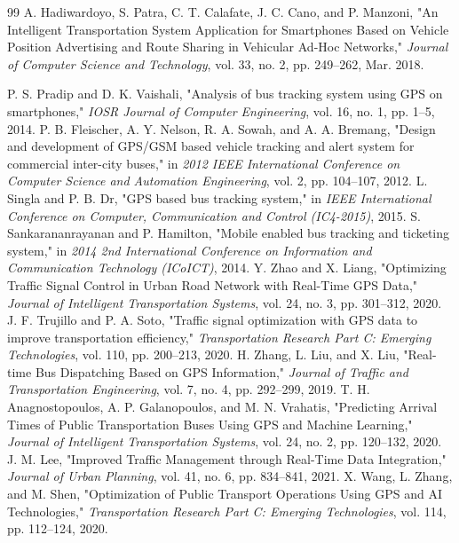 \begin{thebibliography}{99}
 A. Hadiwardoyo, S. Patra, C. T. Calafate, J. C. Cano, and P. Manzoni, "An Intelligent Transportation System Application for Smartphones Based on Vehicle Position Advertising and Route Sharing in Vehicular Ad-Hoc Networks," \textit{Journal of Computer Science and Technology}, vol. 33, no. 2, pp. 249--262, Mar. 2018.

 P. S. Pradip and D. K. Vaishali, "Analysis of bus tracking system using GPS on smartphones," \textit{IOSR Journal of Computer Engineering}, vol. 16, no. 1, pp. 1--5, 2014.
 P. B. Fleischer, A. Y. Nelson, R. A. Sowah, and A. A. Bremang, "Design and development of GPS/GSM based vehicle tracking and alert system for commercial inter-city buses," in \textit{2012 IEEE International Conference on Computer Science and Automation Engineering}, vol. 2, pp. 104--107, 2012.
 L. Singla and P. B. Dr, "GPS based bus tracking system," in \textit{IEEE International Conference on Computer, Communication and Control (IC4-2015)}, 2015.
 S. Sankarananrayanan and P. Hamilton, "Mobile enabled bus tracking and ticketing system," in \textit{2014 2nd International Conference on Information and Communication Technology (ICoICT)}, 2014.
 Y. Zhao and X. Liang, "Optimizing Traffic Signal Control in Urban Road Network with Real-Time GPS Data," \textit{Journal of Intelligent Transportation Systems}, vol. 24, no. 3, pp. 301--312, 2020.
 J. F. Trujillo and P. A. Soto, "Traffic signal optimization with GPS data to improve transportation efficiency," \textit{Transportation Research Part C: Emerging Technologies}, vol. 110, pp. 200--213, 2020.
 H. Zhang, L. Liu, and X. Liu, "Real-time Bus Dispatching Based on GPS Information," \textit{Journal of Traffic and Transportation Engineering}, vol. 7, no. 4, pp. 292--299, 2019.
 T. H. Anagnostopoulos, A. P. Galanopoulos, and M. N. Vrahatis, "Predicting Arrival Times of Public Transportation Buses Using GPS and Machine Learning," \textit{Journal of Intelligent Transportation Systems}, vol. 24, no. 2, pp. 120--132, 2020.
 J. M. Lee, "Improved Traffic Management through Real-Time Data Integration," \textit{Journal of Urban Planning}, vol. 41, no. 6, pp. 834--841, 2021.
 X. Wang, L. Zhang, and M. Shen, "Optimization of Public Transport Operations Using GPS and AI Technologies," \textit{Transportation Research Part C: Emerging Technologies}, vol. 114, pp. 112--124, 2020.

\end{thebibliography}
